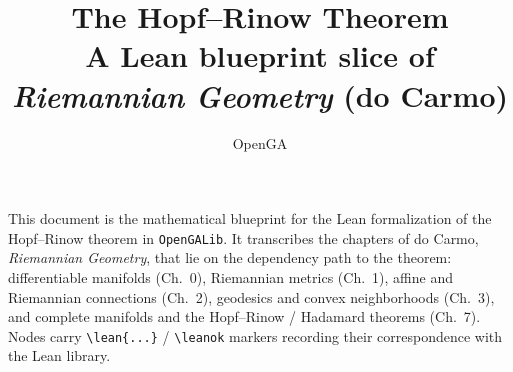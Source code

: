 \documentclass[11pt]{report}
\title{The Hopf--Rinow Theorem\\[0.4em]
  \large A Lean blueprint slice of \emph{Riemannian Geometry} (do Carmo)}
\author{OpenGA}
\date{}
\theoremstyle{plain}
\theoremstyle{definition}
\theoremstyle{remark}
\begin{document}
\maketitle

\noindent
This document is the mathematical blueprint for the Lean formalization of the
Hopf--Rinow theorem in \texttt{OpenGALib}. It transcribes the chapters of do
Carmo, \emph{Riemannian Geometry}, that lie on the dependency path to the theorem:
differentiable manifolds (Ch.~0), Riemannian metrics (Ch.~1), affine and
Riemannian connections (Ch.~2), geodesics and convex neighborhoods (Ch.~3), and
complete manifolds and the Hopf--Rinow / Hadamard theorems (Ch.~7). Nodes carry
\texttt{\textbackslash lean\{...\}} / \texttt{\textbackslash leanok} markers
recording their correspondence with the Lean library.

\tableofcontents






\end{document}
